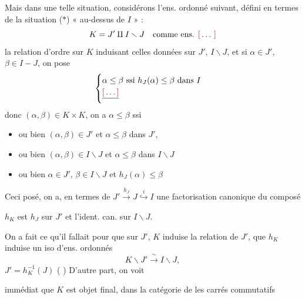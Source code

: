 \documentclass[11pt,a4paper]{article}
\begin{document}
 Mais dans une telle situation, considérons l'ens. ordonné suivant, défini en termes de la situation ($*$) \struck{\ill{}} « au-dessus de $I$ » : \struck{\ill{}}
\[
  K = J' \amalg I \smallsetminus J \quad \text{comme ens. \ill{}}
\]
la relation d'ordre sur $K$ induisant celles données sur $J'$, $I \smallsetminus J$, et si $\alpha \in J'$, $\beta \in I - J$, on pose
\[
  \begin{cases}
    \alpha \leq \beta \text{ ssi } h_{J}(\alpha) \leq \beta \text{ dans } I \\
    \struck{\ill{}}
  \end{cases}
\]
donc $(\alpha, \beta) \in K \times K$, on a $\alpha \leq \beta$ ssi
\begin{itemize}
  \item[—] ou bien \struck{\ill{}} $(\alpha, \beta) \in J'$ et $\alpha \leq \beta$ dans $J'$,
  \item[—] ou bien $(\alpha, \beta) \in I \smallsetminus J$ et $\alpha \leq \beta$ dans $I \smallsetminus J$
  \item[—] ou bien $\alpha \in J'$, $\beta \in I \smallsetminus J$ et $h_{J}(\alpha) \leq \beta$
\end{itemize}
Ceci posé, on a, en termes de $J' \xrightarrow{h_{J}} J \overset{i}{\hookrightarrow} I$ une factorisation canonique du composé


$h_{K}$ est $h_{J}$ sur $J'$ et l'ident. can. sur $I \smallsetminus J$.

On a fait ce qu'il fallait  pour que sur $J'$, $K$ induise la relation de $J'$, que $h_{K}$ induise un iso d'ens. ordonnés
\[
  K \smallsetminus J' \xrightarrow{\ \sim\ } I \smallsetminus J ,
\]
  \ill{} $J' = h_{K}^{-1}(J)$ ( \ill{} \struck{\ill{} \ill{}} \ill{}) D'autre part, on voit

immédiat que $K$ est objet final, dans la catégorie de  les carrés commutatifs

\end{document}
